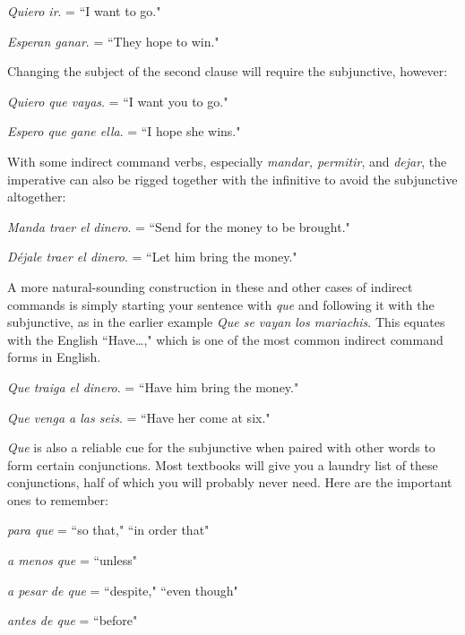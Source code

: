 \bsk

\indu \emph{Quiero ir}. = ``I want to go."

\indu \emph{Esperan ganar}. = ``They hope to win."

\bsk

Changing the subject of the second clause will require the subjunctive,
however:

\bsk

\indu \emph{Quiero que vayas}. = ``I want you to go."

\indu \emph{Espero que gane ella}. = ``I hope she wins."

\bsk

With some indirect command verbs, especially \emph{mandar, permitir}, and \emph{dejar}, the imperative can also be rigged together with the
infinitive to avoid the subjunctive altogether:

\bsk

\indu \emph{Manda traer el dinero}. = ``Send for the money to be brought."

\indu \emph{Déjale traer el dinero}. = ``Let him bring the money."

\bsk

A more natural-sounding construction in these and other cases of indirect commands is simply starting your sentence with \emph{que} and following it with the subjunctive, as in the earlier example \emph{Que se vayan los
mariachis}. This equates with the English ``Have\ldots{}," which is one of
the most common indirect command forms in English.

\bsk

\indu \emph{Que traiga el dinero}. = ``Have him bring the money."

\indu \emph{Que venga a las seis}. = ``Have her come at six."

\bsk

\emph{Que} is also a reliable cue for the subjunctive when paired with
other words to form certain conjunctions. Most textbooks will give
you a laundry list of these conjunctions, half of which you will probably never need. Here are the important ones to remember:

\bsk

\indu \emph{para que} = ``so that," ``in order that"

\indu \emph{a menos que} = ``unless"

\indu \emph{a pesar de que} = ``despite," ``even though"

\indu \emph{antes de que} = ``before"

